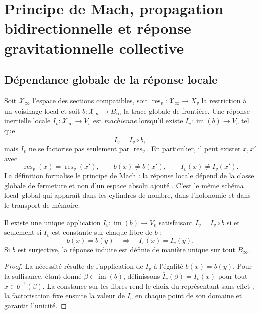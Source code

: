 \section{Principe de Mach, propagation bidirectionnelle et réponse gravitationnelle collective}
\label{chap:mach-onda-bidireccional-rev10}

\subsection{Dépendance globale de la réponse locale}

Soit \(\mathcal X_\infty\) l’espace des sections compatibles, soit \(\operatorname{res}_v:\mathcal X_\infty\to X_v\) la restriction à un voisinage local et soit \(b:\mathcal X_\infty\to B_\infty\) la trace globale de frontière. Une réponse inertielle locale \(I_v:\mathcal X_\infty\to V_v\) est \emph{machienne} lorsqu’il existe \(\overline I_v:\operatorname{im}(b)\to V_v\) tel que
\begin{equation}
 I_v=\overline I_v\circ b,
 \label{eq:factorizacion-mach-rev10}
\end{equation}
mais \(I_v\) ne se factorise pas seulement par \(\operatorname{res}_v\). En particulier, il peut exister \(x,x'\) avec
\[
 \operatorname{res}_v(x)=\operatorname{res}_v(x'),\qquad
 b(x)\ne b(x'),\qquad I_v(x)\ne I_v(x').
\]
La définition formalise le principe de Mach : la réponse locale dépend de la classe globale de fermeture et non d’un espace absolu ajouté \cite{MachMechanics}. C’est le même schéma local--global qui apparaît dans les cylindres de nombre, dans l’holonomie et dans le transport de mémoire.

\begin{theorem}
\label{thm:criterio-factorizacion-machiana-rev2}
Il existe une unique application \(\overline I_v:\operatorname{im}(b)\to V_v\) satisfaisant \(I_v=\overline I_v\circ b\) si et seulement si \(I_v\) est constante sur chaque fibre de \(b\) :
\[
 b(x)=b(y)\quad\Longrightarrow\quad I_v(x)=I_v(y).
\]
Si \(b\) est surjective, la réponse induite est définie de manière unique sur tout \(B_\infty\).
\end{theorem}

\begin{proof}
La nécessité résulte de l’application de \(\overline I_v\) à l’égalité \(b(x)=b(y)\). Pour la suffisance, étant donné \(\beta\in\operatorname{im}(b)\), définissons \(\overline I_v(\beta)=I_v(x)\) pour tout \(x\in b^{-1}(\beta)\). La constance sur les fibres rend le choix du représentant sans effet ; la factorisation fixe ensuite la valeur de \(\overline I_v\) en chaque point de son domaine et garantit l’unicité.
\end{proof}

